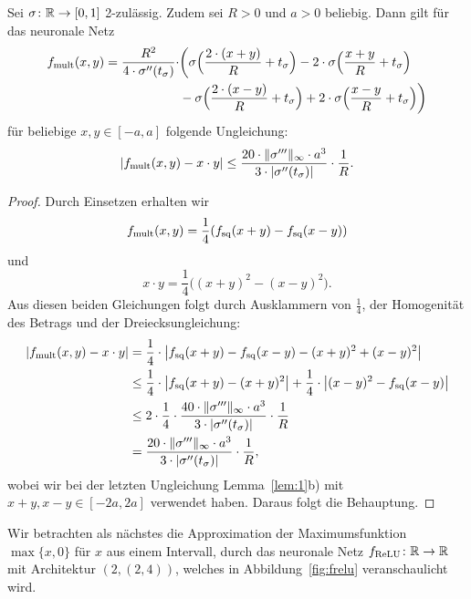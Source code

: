 \begin{lem}
  \label{lem:2}
  Sei $\sigma \colon \mathbb{R} \to [0, 1]$ 2-zulässig. Zudem sei $R > 0$ und $a > 0$ beliebig. Dann gilt für das neuronale Netz
  \begin{equation*}
  	\begin{split}
  	f_{\mathrm{mult}}(x, y) = \frac{R^2}{4 \cdot \sigma''(t_{\sigma})} \cdot & \bigg(\sigma\Big(\frac{2 \cdot (x + y)}{R} + t_{\sigma} \Big) - 2 \cdot \sigma\Big(\frac{x + y}{R} + t_{\sigma}\Big) \\
  	& - \sigma \Big(\frac{2 \cdot (x - y)}{R} + t_{\sigma} \Big) + 2 \cdot \sigma \Big(\frac{x - y}{R} + t_{\sigma} \Big) \bigg)
  	\end{split}
  	\end{equation*}
  	für beliebige $x, y \in [-a, a]$ folgende Ungleichung:
  	$$|f_{\mathrm{mult}}(x, y) - x \cdot y| \leq \frac{20 \cdot \|\sigma'''\|_{\infty} \cdot a ^3}{3 \cdot |\sigma''(t_{\sigma})|} \cdot \frac{1}{R}.$$
  \end{lem}
  \begin{proof}
  Durch Einsetzen erhalten wir $$f_{\mathrm{mult}}(x,y) = \frac{1}{4}(f_{\mathrm{sq}}(x + y) - f_{\mathrm{sq}}(x - y))$$ und $$x \cdot y = \frac{1}{4}\big((x + y)^2 - (x - y)^2\big).$$
  Aus diesen beiden Gleichungen folgt durch Ausklammern von $\frac{1}{4}$, der Homogenität des Betrags und der Dreiecksungleichung:
  \begin{equation*}
  \begin{split}
  |f_{\mathrm{mult}}(x, y) - x \cdot y| & = \frac{1}{4} \cdot \big|f_{\mathrm{sq}}(x + y) - f_{\mathrm{sq}}(x - y) - (x + y)^2 + (x - y)^2\big| \\
  & \leq \frac{1}{4} \cdot \big|f_{\mathrm{sq}}(x + y) - (x + y)^2\big| + \frac{1}{4}\cdot\big| (x - y)^2 - f_{\mathrm{sq}}(x - y)\big| \\
  & \leq 2 \cdot \frac{1}{4} \cdot \frac{40 \cdot \|\sigma'''\|_{\infty} \cdot a^3}{3 \cdot |\sigma''(t_{\sigma})|} \cdot \frac{1}{R} \\
  & = \frac{20 \cdot \|\sigma'''\|_{\infty} \cdot a ^3}{3 \cdot |\sigma''(t_{\sigma})|} \cdot \frac{1}{R},
  \end{split}
\end{equation*}   
wobei wir bei der letzten Ungleichung Lemma~\ref{lem:1}b) mit $x + y, x - y \in [-2a, 2a]$ verwendet haben. Daraus folgt die Behauptung.
  \end{proof}
Wir betrachten als nächstes die Approximation der Maximumsfunktion $\max\{x, 0\}$ für $x$ aus einem Intervall, durch das neuronale Netz $f_{\mathrm{ReLU}}\colon \mathbb{R} \to \mathbb{R}$ mit Architektur $(2,(2,4))$, welches in Abbildung~\ref{fig:frelu} veranschaulicht wird.
